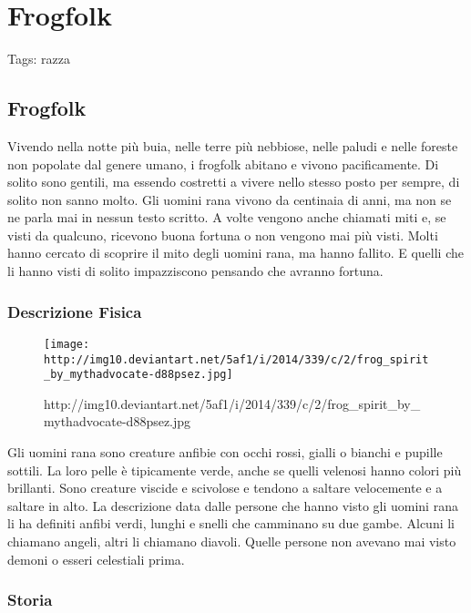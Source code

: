 \section{Frogfolk}\label{frogfolk}

Tags: razza

\subsection{Frogfolk}\label{frogfolk-1}

Vivendo nella notte più buia, nelle terre più nebbiose, nelle paludi e
nelle foreste non popolate dal genere umano, i frogfolk abitano e vivono
pacificamente. Di solito sono gentili, ma essendo costretti a vivere
nello stesso posto per sempre, di solito non sanno molto. Gli uomini
rana vivono da centinaia di anni, ma non se ne parla mai in nessun testo
scritto. A volte vengono anche chiamati miti e, se visti da qualcuno,
ricevono buona fortuna o non vengono mai più visti. Molti hanno cercato
di scoprire il mito degli uomini rana, ma hanno fallito. E quelli che li
hanno visti di solito impazziscono pensando che avranno fortuna.

\subsubsection{\texorpdfstring{\textbf{Descrizione
Fisica}}{Descrizione Fisica}}\label{descrizione-fisica}

\begin{figure}
\centering
\texttt{[image: http://img10.deviantart.net/5af1/i/2014/339/c/2/frog\_spirit\_by\_mythadvocate-d88psez.jpg]}
\caption{http://img10.deviantart.net/5af1/i/2014/339/c/2/frog\_spirit\_by\_mythadvocate-d88psez.jpg}
\end{figure}

Gli uomini rana sono creature anfibie con occhi rossi, gialli o bianchi
e pupille sottili. La loro pelle è tipicamente verde, anche se quelli
velenosi hanno colori più brillanti. Sono creature viscide e scivolose e
tendono a saltare velocemente e a saltare in alto. La descrizione data
dalle persone che hanno visto gli uomini rana li ha definiti anfibi
verdi, lunghi e snelli che camminano su due gambe. Alcuni li chiamano
angeli, altri li chiamano diavoli. Quelle persone non avevano mai visto
demoni o esseri celestiali prima.

\subsubsection{Storia}\label{storia}

